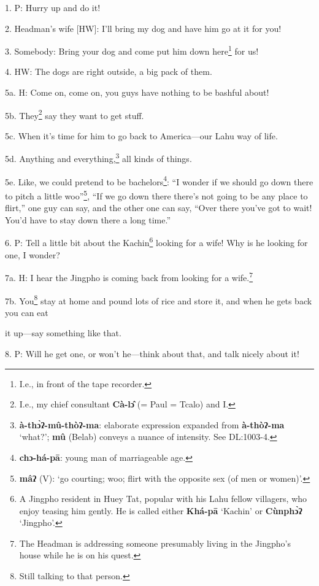 \setcounter{footnote}{0}

1. P: Hurry up and do it!

2. Headman's wife [HW]: I'll bring my dog and have him go at it for you!

3. Somebody: Bring your dog and come put him down here\footnote{I.e., in front of the tape recorder.} for us!

4. HW: The dogs are right outside, a big pack of them.

5a. H: Come on, come on, you guys have nothing to be bashful about!

5b. They\footnote{I.e., my chief consultant \textbf{Cà-lɔ̂} (= Paul = Tcalo) and I.} say they want to get stuff.

5c. When it's time for him to go back to America---our Lahu way of life.

5d. Anything and everything,\footnote{\textbf{à-thɔ̀ʔ-mû-thòʔ-ma}: elaborate expression expanded from \textbf{à-thòʔ-ma} `what?'; \textbf{mû} (Belab) conveys a nuance of intensity. See DL:1003-4.} all kinds of things.

5e. Like, we could pretend to be bachelors\footnote{\textbf{chɔ-há-pā}: young man of marriageable age.}: ``I wonder if we should go down
there to pitch a little woo''\footnote{\textbf{mâʔ} (V): `go courting; woo; flirt with the opposite sex (of men or women)'.}, ``If we go down there there's not going
to be any place to flirt,'' one guy can say, and the other one can say, ``Over
there you've got to wait! You'd have to stay down there a long time.''

6. P: Tell a little bit about the Kachin\footnote{A Jingpho resident in Huey Tat, popular with his Lahu fellow villagers, who enjoy teasing him gently. He is called either \textbf{Khá-pā} `Kachin' or \textbf{Cùnphɔ̀ʔ} `Jingpho'.} looking for a wife! Why is he looking
for one, I wonder?


7a. H: I hear the Jingpho is coming back from looking for a wife.\footnote{The Headman is addressing someone presumably living in the Jingpho's house while he is on his quest.}

7b. You\footnote{Still talking to that person.} stay at home and pound lots of rice and store it, and when he gets
back you can eat

it up---say something like that.

8. P: Will he get one, or won't he---think about that, and talk nicely about it!

